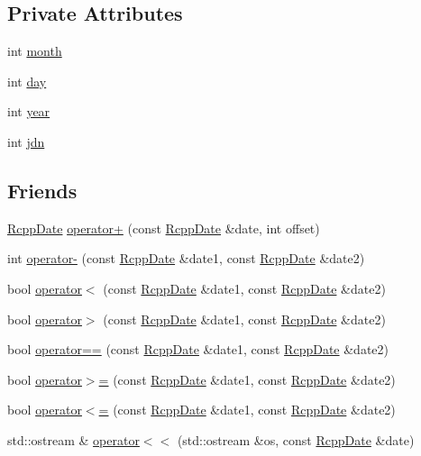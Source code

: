 \subsection*{Private Attributes}
\begin{DoxyCompactItemize}
\item 
int \hyperlink{classRcppDate_a00bf3ece7320d63aee4f6b6df82b4f63}{month}
\item 
int \hyperlink{classRcppDate_a9e6aec176d9432829a304550eadd4205}{day}
\item 
int \hyperlink{classRcppDate_a8881f654ebf42cdf71fdcfce402f0cad}{year}
\item 
int \hyperlink{classRcppDate_ab883f696379dd06e39c6c9b3502a2164}{jdn}
\end{DoxyCompactItemize}
\subsection*{Friends}
\begin{DoxyCompactItemize}
\item 
\hyperlink{classRcppDate}{RcppDate} \hyperlink{classRcppDate_add881a27c2b8e36897a59bca1d04585f}{operator+} (const \hyperlink{classRcppDate}{RcppDate} \&date, int offset)
\item 
int \hyperlink{classRcppDate_a49241820910c75948937f70f76c0849d}{operator-\/} (const \hyperlink{classRcppDate}{RcppDate} \&date1, const \hyperlink{classRcppDate}{RcppDate} \&date2)
\item 
bool \hyperlink{classRcppDate_af852d3a1ad52776201f385be5ea18c71}{operator$<$} (const \hyperlink{classRcppDate}{RcppDate} \&date1, const \hyperlink{classRcppDate}{RcppDate} \&date2)
\item 
bool \hyperlink{classRcppDate_a80164a177c098301c1d509fdab702567}{operator$>$} (const \hyperlink{classRcppDate}{RcppDate} \&date1, const \hyperlink{classRcppDate}{RcppDate} \&date2)
\item 
bool \hyperlink{classRcppDate_ad6c1518c6eb9480665f532dbcc6dd2d5}{operator==} (const \hyperlink{classRcppDate}{RcppDate} \&date1, const \hyperlink{classRcppDate}{RcppDate} \&date2)
\item 
bool \hyperlink{classRcppDate_af7a217e1f5d4a91e2d86fc4da858a6c2}{operator$>$=} (const \hyperlink{classRcppDate}{RcppDate} \&date1, const \hyperlink{classRcppDate}{RcppDate} \&date2)
\item 
bool \hyperlink{classRcppDate_a594132f5ef49b4f477d32289ced4df83}{operator$<$=} (const \hyperlink{classRcppDate}{RcppDate} \&date1, const \hyperlink{classRcppDate}{RcppDate} \&date2)
\item 
std::ostream \& \hyperlink{classRcppDate_a62c075d47528a48e5fb57c1855c4d71c}{operator$<$$<$} (std::ostream \&os, const \hyperlink{classRcppDate}{RcppDate} \&date)
\end{DoxyCompactItemize}


